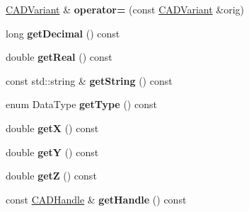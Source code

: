 \begin{DoxyCompactItemize}
\item 
\hyperlink{class_c_a_d_variant}{C\+A\+D\+Variant} \& {\bfseries operator=} (const \hyperlink{class_c_a_d_variant}{C\+A\+D\+Variant} \&orig)\hypertarget{class_c_a_d_variant_a260d29f3aa99eed02ea742c2ddc2313c}{}\label{class_c_a_d_variant_a260d29f3aa99eed02ea742c2ddc2313c}

\item 
long {\bfseries get\+Decimal} () const \hypertarget{class_c_a_d_variant_a6a265d865868d3f4b3419eb1cd345532}{}\label{class_c_a_d_variant_a6a265d865868d3f4b3419eb1cd345532}

\item 
double {\bfseries get\+Real} () const \hypertarget{class_c_a_d_variant_a5df0a04b59b49dbca75d1f1db55153ab}{}\label{class_c_a_d_variant_a5df0a04b59b49dbca75d1f1db55153ab}

\item 
const std\+::string \& {\bfseries get\+String} () const \hypertarget{class_c_a_d_variant_ae344804201e52110e53cac94692d78a2}{}\label{class_c_a_d_variant_ae344804201e52110e53cac94692d78a2}

\item 
enum Data\+Type {\bfseries get\+Type} () const \hypertarget{class_c_a_d_variant_a6c71f92e7012ac5ca85331d33e6c5821}{}\label{class_c_a_d_variant_a6c71f92e7012ac5ca85331d33e6c5821}

\item 
double {\bfseries getX} () const \hypertarget{class_c_a_d_variant_a6b2b730d0ab1566305855df53cb32437}{}\label{class_c_a_d_variant_a6b2b730d0ab1566305855df53cb32437}

\item 
double {\bfseries getY} () const \hypertarget{class_c_a_d_variant_a5a4cda78486f7d8431e473644970d0b4}{}\label{class_c_a_d_variant_a5a4cda78486f7d8431e473644970d0b4}

\item 
double {\bfseries getZ} () const \hypertarget{class_c_a_d_variant_a40e209ceb96c1936fe0c365ab8d374ff}{}\label{class_c_a_d_variant_a40e209ceb96c1936fe0c365ab8d374ff}

\item 
const \hyperlink{class_c_a_d_handle}{C\+A\+D\+Handle} \& {\bfseries get\+Handle} () const \hypertarget{class_c_a_d_variant_ad7be9eb2e34e369c00598d7b279603e0}{}\label{class_c_a_d_variant_ad7be9eb2e34e369c00598d7b279603e0}

\end{DoxyCompactItemize}
